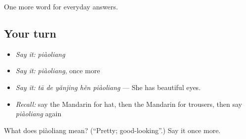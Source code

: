 \begin{grammarlens}[title={What you've built}]
One more word for everyday answers.
\end{grammarlens}

\subsection*{Your turn}
\begin{itemize}
\raggedright
  \item \emph{Say it:} \emph{piàoliang}
  \item \emph{Say it:} \emph{piàoliang}, once more
  \item \emph{Say it:} \emph{tā de yǎnjing hěn piàoliang} — She has beautiful eyes.
  \item \emph{Recall:} say the Mandarin for hat, then the Mandarin for trousers, then say \emph{piàoliang} again
\end{itemize}

\begin{tcolorbox}[breakable,colback=teal!4,colframe=teal!35!black,title={Before you move on}]
What does piàoliang mean? (\textquotedblleft{}Pretty; good-looking\textquotedblright{}.) Say it once more.
\end{tcolorbox}
